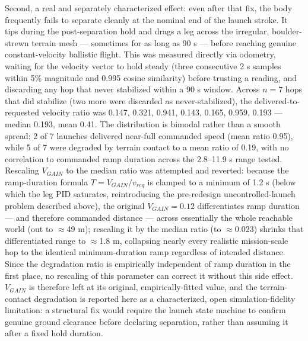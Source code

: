 \documentclass[conference]{IEEEtran}
\begin{document}
Second, a real and separately characterized effect: even after that fix, the body frequently fails to separate cleanly at the nominal end of the launch stroke. It tips during the post-separation hold and drags a leg across the irregular, boulder-strewn terrain mesh --- sometimes for as long as 90 s --- before reaching genuine constant-velocity ballistic flight. This was measured directly via odometry, waiting for the velocity vector to hold steady (three consecutive 2 s samples within 5\% magnitude and 0.995 cosine similarity) before trusting a reading, and discarding any hop that never stabilized within a 90 s window. Across $n=7$ hops that did stabilize (two more were discarded as never-stabilized), the delivered-to-requested velocity ratio was 0.147, 0.321, 0.941, 0.143, 0.165, 0.959, 0.193 --- median 0.193, mean 0.41. The distribution is bimodal rather than a smooth spread: 2 of 7 launches delivered near-full commanded speed (mean ratio 0.95), while 5 of 7 were degraded by terrain contact to a mean ratio of 0.19, with no correlation to commanded ramp duration across the 2.8--11.9 s range tested. Rescaling $V_{GAIN}$ to the median ratio was attempted and reverted: because the ramp-duration formula $T = V_{GAIN}/v_{req}$ is clamped to a minimum of 1.2 s (below which the leg PID saturates, reintroducing the pre-redesign uncontrolled-launch problem described above), the original $V_{GAIN} = 0.12$ differentiates ramp duration --- and therefore commanded distance --- across essentially the whole reachable world (out to $\approx$49 m); rescaling it by the median ratio (to $\approx$0.023) shrinks that differentiated range to $\approx$1.8 m, collapsing nearly every realistic mission-scale hop to the identical minimum-duration ramp regardless of intended distance. Since the degradation ratio is empirically independent of ramp duration in the first place, no rescaling of this parameter can correct it without this side effect. $V_{GAIN}$ is therefore left at its original, empirically-fitted value, and the terrain-contact degradation is reported here as a characterized, open simulation-fidelity limitation: a structural fix would require the launch state machine to confirm genuine ground clearance before declaring separation, rather than assuming it after a fixed hold duration.
\end{document}
